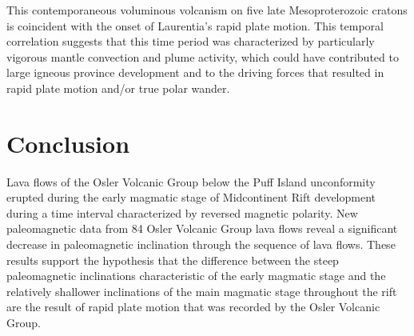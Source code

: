 \documentclass[draft,gc]{AGUTeX}
\begin{document}
\begin{article}
This contemporaneous voluminous volcanism on five late Mesoproterozoic cratons is coincident with the onset of Laurentia's rapid plate motion. This temporal correlation suggests that this time period was characterized by particularly vigorous mantle convection and plume activity, which could have contributed to large igneous province development and to the driving forces that resulted in rapid plate motion and/or true polar wander.

\section{Conclusion}

Lava flows of the Osler Volcanic Group below the Puff Island unconformity erupted during the early magmatic stage of Midcontinent Rift development during a time interval characterized by reversed magnetic polarity. New paleomagnetic data from 84 Osler Volcanic Group lava flows reveal a significant decrease in paleomagnetic inclination through the sequence of lava flows. These results support the hypothesis that the difference between the steep paleomagnetic inclinations characteristic of the early magmatic stage and the relatively shallower inclinations of the main magmatic stage throughout the rift are the result of rapid plate motion that was recorded by the Osler Volcanic Group.


%
%
%
%
%
%
%


\end{article}
\end{document}
